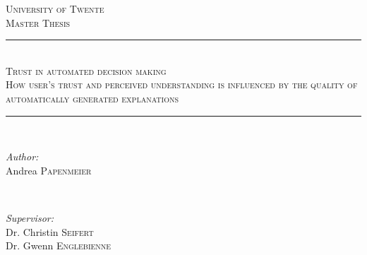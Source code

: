 \begin{titlepage}

\newcommand{\HRule}{\rule{\linewidth}{0.5mm}} %

\center %
 

\textsc{\LARGE University of Twente}\\[1.5cm] %
\textsc{\large Master Thesis}\\[0.5cm] %


\HRule \\[0.4cm]
\textsc{\Large Trust in automated decision making}\\[0.5cm] %
\textsc{\large How user's trust and perceived understanding is influenced by the quality of automatically generated explanations}\\[0.5cm] %
\HRule \\[1.5cm]
 


\begin{minipage}{0.4\textwidth}
\begin{flushleft} \large
\emph{Author:}\\
Andrea \textsc{Papenmeier} %
\end{flushleft}
\end{minipage}
~
\begin{minipage}{0.4\textwidth}
\begin{flushright} \large
\emph{Supervisor:} \\
Dr. Christin \textsc{Seifert} \\%
Dr. Gwenn \textsc{Englebienne} %
\end{flushright}
\end{minipage}\\[2cm]



\end{titlepage}
